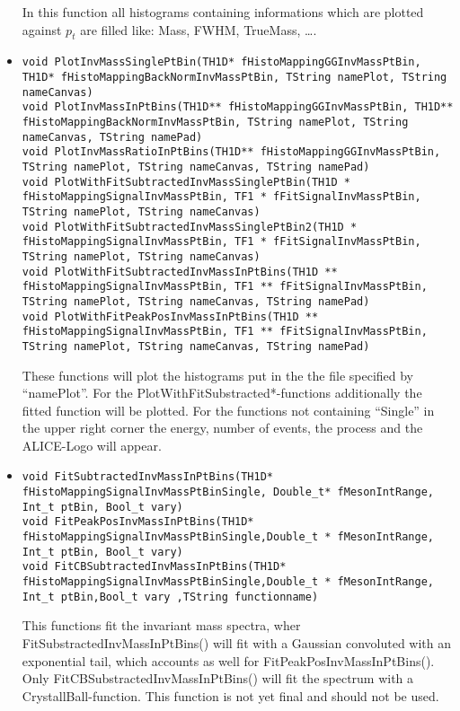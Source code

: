 \begin{itemize}
			In this function all histograms containing informations which are plotted against $p_t$ are filled like: Mass, FWHM, TrueMass, \ldots.
		\item \begin{lstlisting}
void PlotInvMassSinglePtBin(TH1D* fHistoMappingGGInvMassPtBin, TH1D* fHistoMappingBackNormInvMassPtBin, TString namePlot, TString nameCanvas)
void PlotInvMassInPtBins(TH1D** fHistoMappingGGInvMassPtBin, TH1D** fHistoMappingBackNormInvMassPtBin, TString namePlot, TString nameCanvas, TString namePad)
void PlotInvMassRatioInPtBins(TH1D** fHistoMappingGGInvMassPtBin, TString namePlot, TString nameCanvas, TString namePad)
void PlotWithFitSubtractedInvMassSinglePtBin(TH1D * fHistoMappingSignalInvMassPtBin, TF1 * fFitSignalInvMassPtBin, TString namePlot, TString nameCanvas) 
void PlotWithFitSubtractedInvMassSinglePtBin2(TH1D * fHistoMappingSignalInvMassPtBin, TF1 * fFitSignalInvMassPtBin, TString namePlot, TString nameCanvas)
void PlotWithFitSubtractedInvMassInPtBins(TH1D ** fHistoMappingSignalInvMassPtBin, TF1 ** fFitSignalInvMassPtBin, TString namePlot, TString nameCanvas, TString namePad)
void PlotWithFitPeakPosInvMassInPtBins(TH1D ** fHistoMappingSignalInvMassPtBin, TF1 ** fFitSignalInvMassPtBin, TString namePlot, TString nameCanvas, TString namePad)
		      \end{lstlisting}
			These functions will plot the histograms put in the the file specified by ``namePlot''. For the PlotWithFitSubstracted*-functions additionally the fitted function will be plotted. For the functions not containing ``Single'' in the upper right corner the energy, number of events, the process 
			and the ALICE-Logo will appear.
		\item \begin{lstlisting}	
void FitSubtractedInvMassInPtBins(TH1D* fHistoMappingSignalInvMassPtBinSingle, Double_t* fMesonIntRange, Int_t ptBin, Bool_t vary)
void FitPeakPosInvMassInPtBins(TH1D* fHistoMappingSignalInvMassPtBinSingle,Double_t * fMesonIntRange, Int_t ptBin, Bool_t vary)
void FitCBSubtractedInvMassInPtBins(TH1D* fHistoMappingSignalInvMassPtBinSingle,Double_t * fMesonIntRange, Int_t ptBin,Bool_t vary ,TString functionname)	        
		      \end{lstlisting}
			This functions fit the invariant mass spectra, wher FitSubstractedInvMassInPtBins() will fit with a Gaussian convoluted with an exponential tail, which accounts as well for FitPeakPosInvMassInPtBins(). Only FitCBSubstractedInvMassInPtBins() will fit the spectrum with a CrystallBall-function. This function is not yet final and should not be used.

\end{itemize}
